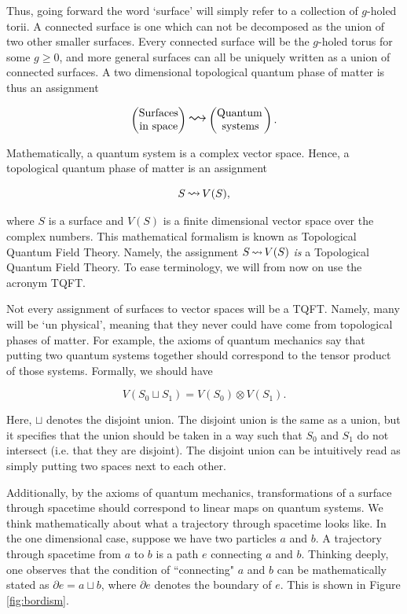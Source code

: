 \documentclass{article}
\theoremstyle{definition}
\numberwithin{figure}{section}
\begin{document}
Thus, going forward the word `surface' will simply refer to a collection of $g$-holed torii. A connected surface is one which can not be decomposed as the union of two other smaller surfaces. Every connected surface will be the $g$-holed torus for some $g\geq0$, and more general surfaces can all be uniquely written as a union of connected surfaces. A two dimensional topological quantum phase of matter is thus an assignment

$$
\begin{pmatrix}
\text{Surfaces} \\
\text{in space}
\end{pmatrix}
\bigleadsto
\begin{pmatrix}
\text{Quantum\,} \\ \text{systems}
\end{pmatrix}.
$$

Mathematically, a quantum system is a complex vector space. Hence, a topological quantum phase of matter is an assignment

$$S \,\mathlarger{\leadsto}\,V(S),$$

where $S$ is a surface and $V(S)$ is a finite dimensional vector space over the complex numbers. This mathematical formalism is known as Topological Quantum Field Theory. Namely, the assignment $S \,\mathlarger{\leadsto}\,V(S)$ \textit{is} a Topological Quantum Field Theory. To ease terminology, we will from now on use the acronym TQFT.

Not every assignment of surfaces to vector spaces will be a TQFT. Namely, many will be `un physical', meaning that they never could have come from topological phases of matter. For example, the axioms of quantum mechanics say that putting two quantum systems together should correspond to the tensor product of those systems. Formally, we should have

$$V\left(S_0\sqcup S_1\right)=V(S_0)\otimes V(S_1).$$

Here, $\sqcup$ denotes the disjoint union. The disjoint union is the same as a union, but it specifies that the union should be taken in a way such that $S_0$ and $S_1$ do not intersect (i.e. that they are disjoint). The disjoint union can be intuitively read as simply putting two spaces next to each other.

Additionally, by the axioms of quantum mechanics, transformations of a surface through spacetime should correspond to linear maps on quantum systems. We think mathematically about what a trajectory through spacetime looks like. In the one dimensional case, suppose we have two particles $a$ and $b$. A trajectory through spacetime from $a$ to $b$ is a path $e$ connecting $a$ and $b$. Thinking deeply, one observes that the condition of ``connecting" $a$ and $b$ can be mathematically stated as $\partial e= a \sqcup b$, where $\partial e$ denotes the boundary of $e$. This is shown in Figure \ref{fig:bordism}.
\end{document}
